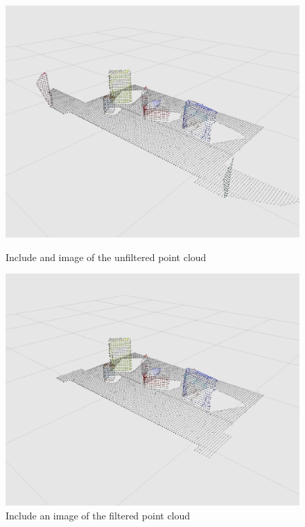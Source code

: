 \documentclass[a4paper]{article}
\begin{document}
\vspace{1cm}

\begin{figure}[h]
\centering
\begin{minipage}{0.45\linewidth}
\centering
\includegraphics[scale=0.2]{image10}
\caption{Include and image of the unfiltered point cloud}
\end{minipage}
\hspace{0.5cm}
\begin{minipage}{0.45\linewidth}
\centering
\includegraphics[scale=0.2]{image7}
\caption{Include an image of the filtered point cloud}
\end{minipage}
\end{figure}
\end{document}
